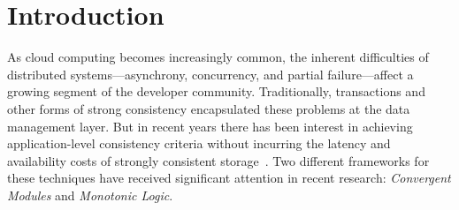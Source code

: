 \section{Introduction}
\label{sec:intro}
As cloud computing becomes increasingly common, the inherent difficulties of distributed systems---asynchrony,
concurrency, and partial failure---affect a growing segment of the developer community.
Traditionally, transactions and other forms of strong consistency encapsulated these problems at the data management layer.  But in recent years there has been interest in achieving application-level consistency criteria without incurring the latency and availability costs of strongly consistent storage~\cite{Birman2009,Helland2009}.
% 
Two different frameworks for these
techniques have received significant attention in recent research:
\emph{Convergent Modules} and \emph{Monotonic Logic}.



